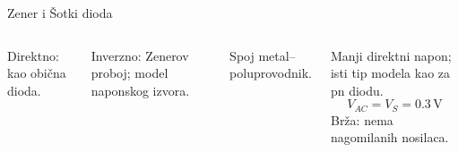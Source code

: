 \begin{frame}[label=10-s003]{Zener i Šotki dioda}
\setlength{\abovedisplayskip}{4pt}\setlength{\belowdisplayskip}{4pt}\setlength{\abovedisplayshortskip}{3pt}\setlength{\belowdisplayshortskip}{3pt}
\begin{columns}[T,onlytextwidth]\medskip
\par\medskip
Direktno: kao obična dioda.\par\bigskip
\par\medskip
Inverzno: Zenerov proboj; model naponskog izvora.\centering {}\medskip
\par\bigskip
Spoj metal–poluprovodnik.\par
Manji direktni napon; isti tip modela kao za pn diodu.
\[V_{AC}=V_S=0.3\,\mathrm{V}\]
Brža: nema nagomilanih nosilaca.\end{columns}
\end{frame}
